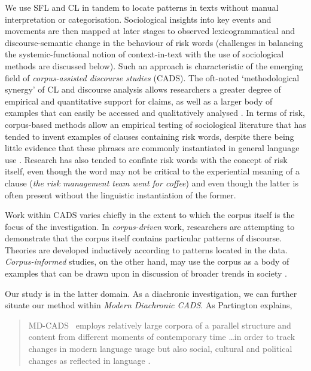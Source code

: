 		We use SFL and CL in tandem to locate patterns in texts without manual interpretation or categorisation. Sociological insights into key events and movements are then mapped at later stages to observed lexicogrammatical and discourse-semantic change in the behaviour of risk words (challenges in balancing the systemic-functional notion of context-in-text with the use of sociological methods are discussed below). Such an approach is characteristic of the emerging field of \emph{corpus-assisted discourse studies} (CADS). The oft-noted `methodological synergy' of CL and discourse analysis allows researchers a greater degree of empirical and quantitative support for claims, as well as a larger body of examples that can easily be accessed and qualitatively analysed \cite{baker_useful_2008}. In terms of risk, corpus-based methods allow an empirical testing of sociological literature that has tended to invent examples of clauses containing risk words, despite there being little evidence that these phrases are commonly instantiated in general language use \cite{hamilton_meanings_2007}. Research has also tended to conflate risk words with the concept of risk itself, even though the word may not be critical to the experiential meaning of a clause (\emph{the risk management team went for coffee}) and even though the latter is often present without the linguistic instantiation of the former.

		Work within CADS varies chiefly in the extent to which the corpus itself is the focus of the investigation. In \emph{corpus-driven} work, researchers are attempting to demonstrate that the corpus itself contains particular patterns of discourse. Theories are developed inductively according to patterns located in the data. \emph{Corpus-informed} studies, on the other hand, may use the corpus as a body of examples that can be drawn upon in discussion of broader trends in society \cite{baker_useful_2008}.

		Our study is in the latter domain.
		As a diachronic investigation, we can further situate our method within \emph{Modern Diachronic CADS}. As Partington explains, 

		\begin{quote}
		\lbrack MD-CADS\rbrack~ employs relatively large corpora of a parallel structure and content from different moments of contemporary time \dots in order to track changes in modern language usage but also social, cultural and political changes as reflected in language \citeyear[p.~83]{partington_modern_2010}.
		\end{quote}

